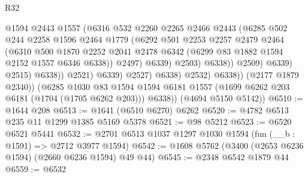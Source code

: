 \begin{lexlean}{R32}
\begin{coremodule}
                                      @1594
                                      @2443
                                      @1557
                                      (@6316
                                        @532
                                        @2260
                                        @2265
                                        @2466
                                        @2443
                                        (@6285
                                          @502
                                          @244
                                          @2258
                                          @1596
                                          @2464
                                          @1779
                                          (@6292
                                            @501
                                            @2253
                                            @2257
                                            @2479
                                            @2464
                                            (@6310
                                              @500
                                              @1870
                                              @2252
                                              @2041
                                              @2478
                                              @6342
                                              (@6299 @83 @1882 @1594 @2152 @1557 @6346 @6338))
                                            @2497)
                                          @6339)
                                        @2503)
                                      @6338))
                                  @2509)
                                @6339)
                              @2515)
                            @6338))
                        @2521)
                      @6339)
                    @2527)
                  @6338)
                @2532)
              @6338))
          (@2177 @1879 @2340))
        (@6285
          @1030
          @83
          @1594
          @1594
          @6181
          @1557
          (@1699 @6262 @203 @6181 (@1704 (@1705 @6262 @203)))
          @6338))
      (@4694 @5150 @5142))
@6510 := @1644 @208
@6513 := @1641 (@6510 @6270) @6262
@6520 := @4782 @6513 @235 @11 @1299 @1385 @5169 @5378
@6521 := @98 @5212
@6523 := @6520 @6521 @5441
@6532 := @2701 @6513 @1037 @1297 @1030 @1594 (fun (__b : @1591) => @2712 @3977 @1594)
@6542 := @1608 @5762 (@3400 (@2653 @6236 @1594) (@2660 @6236 @1594) @49 @44)
@6545 := @2348 @6542 @1879 @44
@6559 := @6532

\end{coremodule}
\end{lexlean}

